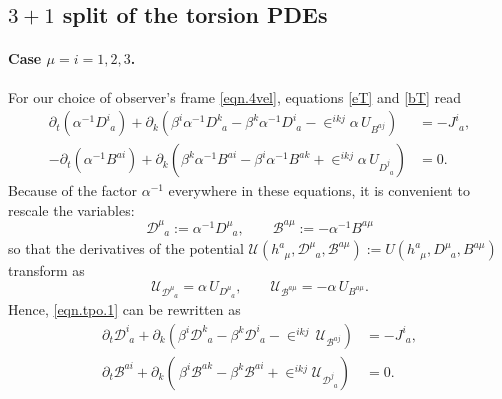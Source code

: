 \documentclass[
10pt, %
a4paper, %
oneside, %
headinclude,footinclude, %
BCOR5mm, %
]{scrartcl}
\newcommand{\IP}[1]{{\color{Red}[IP:\ \ #1]}}
\newcommand{\pd}[1]{\partial_{#1}}
\newcommand{\tetrsymbol}{h}
\newcommand{\tetr}[2]{\tetrsymbol^{#1}_{\phantom{#1}#2}}
\newcommand{\Dm}[2]{D_{\phantom{#2}#1}^{#2}}	%
\newcommand{\aD}[2]{\mathcal{D}_{\phantom{#2}#1}^{#2}}	%
\newcommand{\Bm}[2]{B^{#1#2}}	%
\newcommand{\aB}[2]{\mathcal{B}^{#1#2}}	%
\newcommand{\Um}{U}%
\newcommand{\aU}{\mathcal{U}}%
\newcommand{\LCsymb}{\bm{\in}}    %
\newcommand{\NC}[2]{J^{#2}_{\phantom{#2}#1}}
\newcommand{\lapse}{\alpha}
\newcommand{\shift}[1]{\beta^{#1}}
\begin{document}
\subsection{$ 3+1 $ split of the torsion PDEs}	\label{ssec.31.tors}


\paragraph{Case $ \mu = i=1,2,3 $.} 

For our choice of observer's frame \eqref{eqn.4vel}, equations \eqref{eT} 
and \eqref{bT} read
\begin{subequations}\label{eqn.tpo.1}
	\begin{align}
		\pd{t} (\lapse^{-1}\Dm{a}{i}) + \pd{k}(\shift{i} 
		\lapse^{-1}\Dm{a}{k} - \shift{k}\lapse^{-1}\Dm{a}{i}  - \LCsymb^{ikj} \lapse \,
		\Um_{\Bm{a}{j}}) & 
		= -\NC{a}{i}, \\[2mm]
%
		-\pd{t} (\lapse^{-1}\Bm{a}{i}) + \pd{k}(\shift{k} 
		\lapse^{-1}\Bm{a}{i} - \shift{i}\lapse^{-1}\Bm{a}{k}  + \LCsymb^{ikj} \lapse \,
		\Um_{\Dm{a}{j}}) & 
		= 0 .
	\end{align}
\end{subequations}
Because of the factor $ \alpha^{-1} $ everywhere in these equations, it is convenient to rescale 
the 
variables:
\begin{equation}\label{eqn.varDB}
	\aD{a}{\mu} := \lapse^{-1} \Dm{a}{\mu}, \qquad \aB{a}{\mu} := -\lapse^{-1}\Bm{a}{\mu}
\end{equation}
so that the derivatives of the potential $ \aU(\tetr{a}{\mu},\aD{a}{\mu},\aB{a}{\mu}) := 
\Um(\tetr{a}{\mu},\Dm{a}{\mu},\Bm{a}{\mu})
$ 
transform as
\begin{equation}\label{eqn.change.alphaU}
	\aU_{\aD{a}{\mu}} =  \lapse \, \Um_{\Dm{a}{\mu}},
	\qquad
	\aU_{\aB{a}{\mu}} = -\lapse \, \Um_{\Bm{a}{\mu}}.
\end{equation}
Hence, \eqref{eqn.tpo.1} can be rewritten as
\begin{subequations}\label{eqn.tpo.2}
	\begin{align}
	\pd{t} \aD{a}{i} + \pd{k}(\shift{i} 
	\aD{a}{k} - \shift{k}\aD{a}{i}  - \LCsymb^{ikj} \,
	\aU_{\aB{a}{j}}) & 
	= -\NC{a}{i},\\[2mm]
	\pd{t} \aB{a}{i} + \pd{k}(\,\shift{i} 
	\aB{a}{k} - \shift{k}\aB{a}{i}  + \LCsymb^{ikj} 
	\aU_{\aD{a}{j}}) & 
	= 0.
	\end{align}
\end{subequations}
\end{document}

